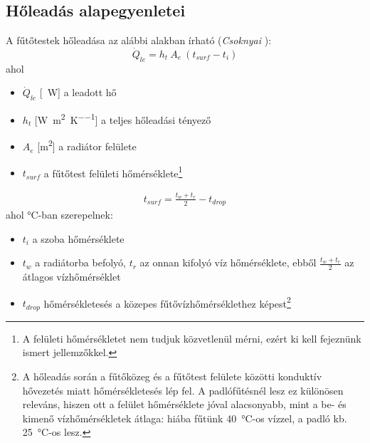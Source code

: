 

\subsection{Hőleadás alapegyenletei}
A fűtőtestek hőleadása az alábbi alakban írható (\textit{Csoknyai} \cite[358.~o.]{Herz}):
\begin{equation} \label{eq_holeadas}
\dot Q_{le} = h_t ~ A_e ~ (t_{surf} - t_i)
\end{equation}
ahol
\begin{itemize}[itemsep=6pt,topsep=0pt,parsep=0pt,partopsep=0pt]
\item[] $\dot{Q}_{le}$ [\SI{}{\watt}] a leadott hő
\item[] $h_t$ [\si[per-mode = fraction]{\watt\per\meter\squared\per\kelvin}] a teljes hőleadási tényező %
\item[] $A_e$ [\si{\metre\squared}] a radiátor felülete
\item[] $t_{surf}$ a fűtőtest felületi hőmérséklete\footnote{A felületi hőmérsékletet nem tudjuk közvetlenül mérni, ezért ki kell fejeznünk ismert jellemzőkkel.}
\end{itemize}
\begin{equation} \label{eq_termeszeteshk_359}
\begin{aligned}
t_{surf} = \frac{t_w+t_r}{2} -t_{drop}
\end{aligned}
\end{equation}
ahol \si{\celsius}-ban szerepelnek:
\begin{itemize}[itemsep=6pt,topsep=0pt,parsep=0pt,partopsep=0pt]
	\item[] $t_i$ a szoba hőmérséklete
	\item[] $t_w$ a radiátorba befolyó, $t_r$ az onnan kifolyó víz hőmérséklete, ebből $\frac{t_w+t_r}{2}$ az átlagos vízhőmérséklet
	\item[] $t_{drop}$ hőmérsékletesés a közepes fűtővízhőmérséklethez képest\footnote{A hőleadás során a fűtőközeg és a fűtőtest felülete közötti konduktív hővezetés miatt hőmérsékletesés lép fel. A padlófűtésnél lesz ez különösen releváns, hiszen ott a felület hőmérséklete jóval alacsonyabb, mint a be- és kimenő vízhőmérsékletek átlaga: hiába fűtünk \SI{40}{\celsius}-os vízzel, a padló kb. \SI{25}{\celsius}-os lesz.}
\end{itemize}
